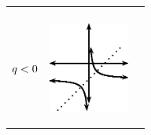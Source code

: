\begin{center}
\begin{xtabular*}{\mytablewidth}[t]{|p{10\mystarwidth}|p{10\mystarwidth}|p{10\mystarwidth}|}
\begin{center}
      \vspace{2pt}
    \vspace{.1in}
    
    \end{center}



    \addtocounter{footnote}{-0}
    
     \tabularnewline{}
    
    
        
                  \begin{math}q<{}0\end{math}
                 &
    
    
        
                  
    \setcounter{subfigure}{0}

\label{m39341*id246981}
    \begin{center}
    \label{m39341*id246981!!!underscore!!!media}\label{m39341*id246981!!!underscore!!!printimage}\includegraphics[width=100px]{col11306.imgs/m39341_MG10C11_024.png} %
        
      \vspace{2pt}
    \vspace{.1in}
    
    \end{center}



    \addtocounter{footnote}{-0}
    
                 &
    

\end{xtabular*}
\end{center}
